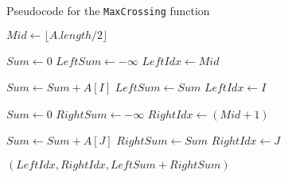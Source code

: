 \begin{frame}
  \begin{block}{Pseudocode for the \texttt{MaxCrossing} function}
  \begin{tiny}
  \begin{algorithmic}
       \State $Mid \gets \lfloor A.length / 2 \rfloor$
       \State

       \State $Sum \gets 0$
       \State $LeftSum \gets -\infty$
       \State $LeftIdx \gets Mid$

       \State
         \State $Sum \gets Sum + A[I]$
           \State $LeftSum \gets Sum$
           \State $LeftIdx \gets I$
         \EndIf
       \EndFor

       \State
       \State $Sum \gets 0$
       \State $RightSum \gets -\infty$
       \State $RightIdx \gets (Mid + 1)$

       \State
       
         \State $Sum \gets Sum + A[J]$
           \State $RightSum \gets Sum$
           \State $RightIdx \gets J$
         \EndIf
       \EndFor

       \State
        $(LeftIdx, RightIdx, LeftSum + RightSum)$
    \EndProcedure
  \end{algorithmic}
  \end{tiny}
  \end{block}
\end{frame}
